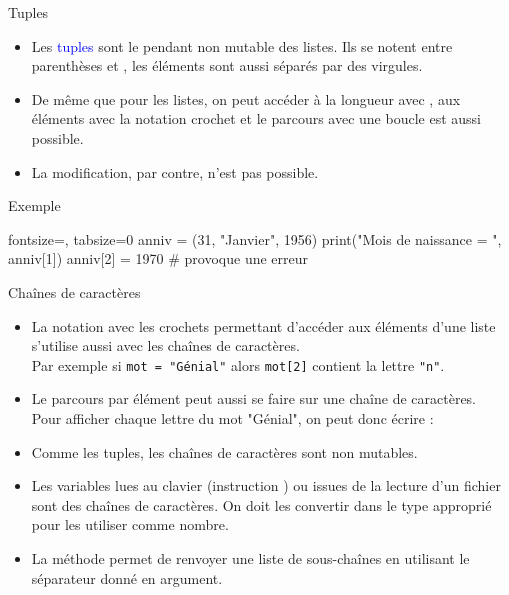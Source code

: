 \documentclass[10pt]{beamer}
\begin{document}
\begin{frame}[fragile]{\Ctitle}{\stitle}
	\begin{alertblock}{Tuples}
		\begin{itemize}
			\item<1-> Les \textcolor{blue}{tuples} sont le pendant non mutable des listes. Ils se notent entre parenthèses \kw{(} et \kw{)}, les éléments sont aussi séparés par des virgules.
			\item<1-> De même que pour les listes, on peut accéder à la longueur avec , aux éléments avec la notation crochet et le parcours avec une boucle  est aussi possible.
			\item<1-> La modification, par contre, n'est pas possible.
		\end{itemize}
	\end{alertblock}
	\begin{exampleblock}{Exemple}
		\begin{codepython*}{fontsize=\small, tabsize=0}
			anniv = (31, "Janvier", 1956)
			print("Mois de naissance = ", anniv[1])
			anniv[2] = 1970 # provoque une erreur
		\end{codepython*}
	\end{exampleblock}
\end{frame}

\begin{frame}[fragile]{\Ctitle}{\stitle}
	\begin{alertblock}{Chaînes de caractères}
		\begin{itemize}
			\item<1-> La notation avec les crochets permettant d'accéder aux éléments d'une liste s'utilise aussi avec les chaînes de caractères. \\
				\onslide<2-> Par exemple si \texttt{mot = "Génial"} alors \texttt{mot[2]} contient la lettre \texttt{"n"}.
			\item<3-> Le parcours par élément peut aussi se faire sur une chaîne de caractères. \\
				\onslide<4-> Pour afficher chaque lettre du mot "Génial", on peut donc écrire :
				\onslide<5->
			\item<6-> Comme les tuples, les chaînes de caractères sont non mutables.
			\item<7-> \textcolor{blue}{\small \important} Les variables lues au clavier (instruction ) ou issues de la lecture d'un fichier sont des chaînes de caractères. On doit les convertir dans le type approprié pour les utiliser comme nombre.
			\item<8-> La méthode  permet de renvoyer une liste de sous-chaînes en utilisant le séparateur donné en argument.
		\end{itemize}
	\end{alertblock}
\end{frame}
\end{document}
